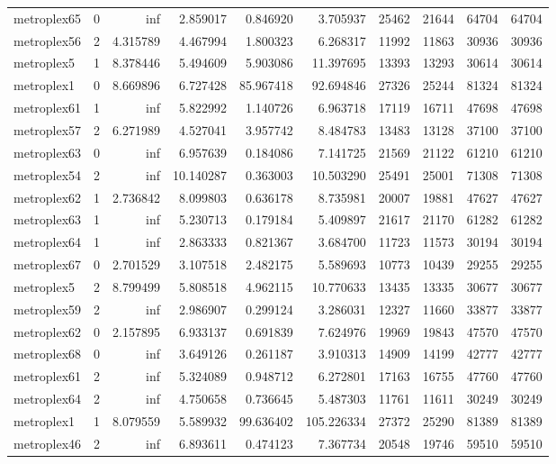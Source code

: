 \begin{longtable}{|l|r|r|r|r|r|r|r|r|r|}
metroplex65 & 0 & inf & 2.859017 & 0.846920 & 3.705937 & 25462 & 21644 & 64704 & 64704 \\
metroplex56 & 2 & 4.315789 & 4.467994 & 1.800323 & 6.268317 & 11992 & 11863 & 30936 & 30936 \\
metroplex5 & 1 & 8.378446 & 5.494609 & 5.903086 & 11.397695 & 13393 & 13293 & 30614 & 30614 \\
metroplex1 & 0 & 8.669896 & 6.727428 & 85.967418 & 92.694846 & 27326 & 25244 & 81324 & 81324 \\
metroplex61 & 1 & inf & 5.822992 & 1.140726 & 6.963718 & 17119 & 16711 & 47698 & 47698 \\
metroplex57 & 2 & 6.271989 & 4.527041 & 3.957742 & 8.484783 & 13483 & 13128 & 37100 & 37100 \\
metroplex63 & 0 & inf & 6.957639 & 0.184086 & 7.141725 & 21569 & 21122 & 61210 & 61210 \\
metroplex54 & 2 & inf & 10.140287 & 0.363003 & 10.503290 & 25491 & 25001 & 71308 & 71308 \\
metroplex62 & 1 & 2.736842 & 8.099803 & 0.636178 & 8.735981 & 20007 & 19881 & 47627 & 47627 \\
metroplex63 & 1 & inf & 5.230713 & 0.179184 & 5.409897 & 21617 & 21170 & 61282 & 61282 \\
metroplex64 & 1 & inf & 2.863333 & 0.821367 & 3.684700 & 11723 & 11573 & 30194 & 30194 \\
metroplex67 & 0 & 2.701529 & 3.107518 & 2.482175 & 5.589693 & 10773 & 10439 & 29255 & 29255 \\
metroplex5 & 2 & 8.799499 & 5.808518 & 4.962115 & 10.770633 & 13435 & 13335 & 30677 & 30677 \\
metroplex59 & 2 & inf & 2.986907 & 0.299124 & 3.286031 & 12327 & 11660 & 33877 & 33877 \\
metroplex62 & 0 & 2.157895 & 6.933137 & 0.691839 & 7.624976 & 19969 & 19843 & 47570 & 47570 \\
metroplex68 & 0 & inf & 3.649126 & 0.261187 & 3.910313 & 14909 & 14199 & 42777 & 42777 \\
metroplex61 & 2 & inf & 5.324089 & 0.948712 & 6.272801 & 17163 & 16755 & 47760 & 47760 \\
metroplex64 & 2 & inf & 4.750658 & 0.736645 & 5.487303 & 11761 & 11611 & 30249 & 30249 \\
metroplex1 & 1 & 8.079559 & 5.589932 & 99.636402 & 105.226334 & 27372 & 25290 & 81389 & 81389 \\
metroplex46 & 2 & inf & 6.893611 & 0.474123 & 7.367734 & 20548 & 19746 & 59510 & 59510 \\

\end{longtable}
